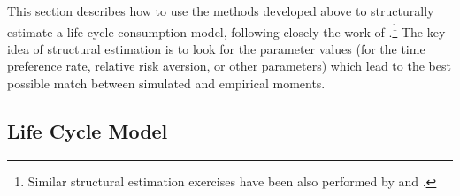 \documentclass[titlepage, headings=optiontotocandhead]{econtex}
\begin{document}
This section describes how to use the methods developed above to
structurally estimate a life-cycle consumption model, following
closely the work of
\cite{cagettiWprofiles}.\footnote{Similar structural
  estimation exercises have been also performed by
  \cite{palumbo:medical} and \cite{gpLifecycle}.} The key idea of
structural estimation is to look for the parameter values (for the
time preference rate, relative risk aversion, or other parameters)
which lead to the best possible match between simulated and empirical
moments.  %

\hypertarget{life-cycle-model}{}
\subsection{Life Cycle Model}\label{subsec:life-cycle-model}
\newcommand{\byage}{\hat}
\end{document}
